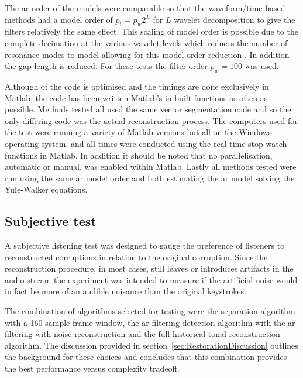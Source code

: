 The \DIFdelbegin {}\DIFdelend \DIFaddbegin \gls{ar} \DIFaddend order of the models were comparable so that the waveform/time based methods had a model order of $p_t = p_w 2^L$ for $L$ wavelet decomposition \DIFdelbegin {}\DIFdelend \DIFaddbegin {}\DIFaddend to give the filters relatively the same effect. This scaling of model order is possible due to the complete decimation at the various wavelet levels which reduces the number of resonance modes to model allowing for this model order reduction \cite{Esquef2006}. In addition the gap length is reduced. For these tests the filter order $p_w = 100$ was used.

Although \DIFdelbegin {}\DIFdelend \DIFaddbegin {}\DIFaddend of the code is optimised and the timings are done exclusively in Matlab, the code has been written \DIFdelbegin {}\DIFdelend \DIFaddbegin {}\DIFaddend Matlab's in-built functions as often as possible. Methods tested all used the same vector segmentation code and so the only differing code was the actual reconstruction process. The computers used for the test were running a variety of Matlab versions but all on the Windows operating system, and all times were conducted using the real time stop watch functions in Matlab. In addition it should be noted that no parallelisation, automatic or manual, was enabled within Matlab. Lastly all methods tested were run using the same \DIFdelbegin {}\DIFdelend \DIFaddbegin \gls{ar} \DIFaddend model order and both estimating the \DIFdelbegin {}\DIFdelend \DIFaddbegin \gls{ar} \DIFaddend model solving the Yule-Walker equations.

\subsection{Subjective test}
A subjective listening test was designed to gauge the preference of listeners to reconstructed corruptions in relation to the original corruption. Since the reconstruction procedure, in most cases, still leaves or introduces artifacts in the audio stream the experiment was intended to measure if the artificial noise would in fact be more of an audible nuisance than the original keystrokes.

The combination of algorithms selected for testing were the separation algorithm with a 160 sample frame window, the \DIFdelbegin {}\DIFdelend \DIFaddbegin \gls{ar} \DIFaddend filtering detection algorithm with the \DIFdelbegin {}\DIFdelend \DIFaddbegin \gls{ar} \DIFaddend filtering with noise reconstruction and the full historical tonal reconstruction algorithm. The discussion provided in section~\ref{sec:RestorationDiscussion} outlines the background for these choices and concludes that this combination provides the best performance versus complexity tradeoff.

